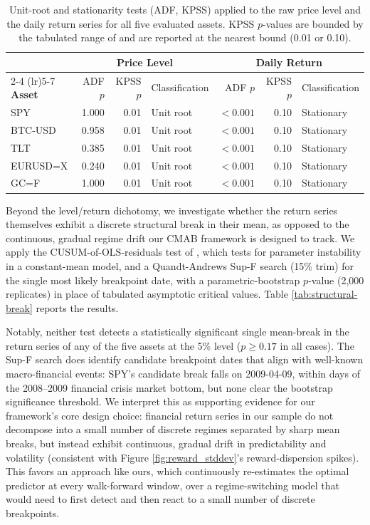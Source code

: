 \documentclass[pdflatex,sn-mathphys-num]{sn-jnl}
\theoremstyle{thmstyleone}%
\theoremstyle{thmstyletwo}%
\theoremstyle{thmstylethree}%
\begin{document}
\begin{appendices}
\begin{table}[htbp]
    \centering
    \caption{Unit-root and stationarity tests (ADF, KPSS) applied to the raw price level and the daily return series for all five evaluated assets. KPSS $p$-values are bounded by the tabulated range of \cite{kwiatkowski1992testing} and are reported at the nearest bound (0.01 or 0.10).}
    \label{tab:stationarity}
    \scriptsize
    \begin{tabular}{@{} l rrl rrl @{}}
    \toprule
     & \multicolumn{3}{c}{\textbf{Price Level}} & \multicolumn{3}{c}{\textbf{Daily Return}} \\
    \cmidrule(lr){2-4} \cmidrule(lr){5-7}
    \textbf{Asset} & ADF $p$ & KPSS $p$ & Classification & ADF $p$ & KPSS $p$ & Classification \\
    \midrule
    SPY & 1.000 & 0.01 & Unit root & $<0.001$ & 0.10 & Stationary \\
    BTC-USD & 0.958 & 0.01 & Unit root & $<0.001$ & 0.10 & Stationary \\
    TLT & 0.385 & 0.01 & Unit root & $<0.001$ & 0.10 & Stationary \\
    EURUSD=X & 0.240 & 0.01 & Unit root & $<0.001$ & 0.10 & Stationary \\
    GC=F & 1.000 & 0.01 & Unit root & $<0.001$ & 0.10 & Stationary \\
    \bottomrule
    \end{tabular}
\end{table}

Beyond the level/return dichotomy, we investigate whether the return series themselves exhibit a discrete structural break in their mean, as opposed to the continuous, gradual regime drift our CMAB framework is designed to track. We apply the CUSUM-of-OLS-residuals test of \cite{ploberger1992cusum}, which tests for parameter instability in a constant-mean model, and a Quandt-Andrews Sup-F search \cite{andrews1993tests} (15\% trim) for the single most likely breakpoint date, with a parametric-bootstrap $p$-value (2,000 replicates) in place of tabulated asymptotic critical values. Table \ref{tab:structural-break} reports the results.

Notably, neither test detects a statistically significant single mean-break in the return series of any of the five assets at the 5\% level ($p \geq 0.17$ in all cases). The Sup-F search does identify candidate breakpoint dates that align with well-known macro-financial events: SPY's candidate break falls on 2009-04-09, within days of the 2008--2009 financial crisis market bottom, but none clear the bootstrap significance threshold. We interpret this as supporting evidence for our framework's core design choice: financial return series in our sample do not decompose into a small number of discrete regimes separated by sharp mean breaks, but instead exhibit continuous, gradual drift in predictability and volatility (consistent with Figure \ref{fig:reward_stddev}'s reward-dispersion spikes). This favors an approach like ours, which continuously re-estimates the optimal predictor at every walk-forward window, over a regime-switching model that would need to first detect and then react to a small number of discrete breakpoints.


\end{appendices}
\end{document}
